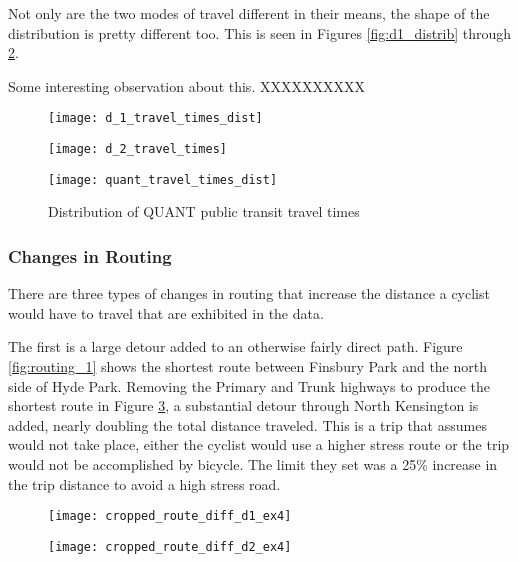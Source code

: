 Not only are the two modes of travel different in their means, the shape of the distribution is pretty different too. This is seen in Figures \ref{fig:d1_distrib} through \ref{fig:quant_distrib}. 

Some interesting observation about this. XXXXXXXXXX


\begin{figure}
\centering
\begin{minipage}{.5\textwidth}
  \centering
  \texttt{[image: d\_1\_travel\_times\_dist]}
  \label{fig:d1_distrib}
\end{minipage}%
\begin{minipage}{.5\textwidth}
  \centering
  \texttt{[image: d\_2\_travel\_times]}
  \label{fig:d2_distrib}
\end{minipage}
\end{figure}

\begin{figure}
\centering
\texttt{[image: quant\_travel\_times\_dist]}
\caption{Distribution of QUANT public transit travel times}
\label{fig:quant_distrib}
\end{figure}


\subsubsection{Changes in Routing} 

There are three types of changes in routing that increase the distance a cyclist would have to travel that are exhibited in the data. 

The first is a large detour added to an otherwise fairly direct path. Figure \ref{fig:routing_1} shows the shortest route between Finsbury Park and the north side of Hyde Park. Removing the Primary and Trunk highways to produce the shortest route in Figure \ref{fig:routing_2}, a substantial detour through North Kensington is added, nearly doubling the total distance traveled. This is a trip that \cite{furth2016network} assumes would not take place, either the cyclist would use a higher stress route or the trip would not be accomplished by bicycle. The limit they set was a 25\% increase in the trip distance to avoid a high stress road. 

\begin{figure}
\centering
\begin{minipage}{.5\textwidth}
  \centering
  \texttt{[image: cropped\_route\_diff\_d1\_ex4]}
  \label{fig:routing_1}
\end{minipage}%
\begin{minipage}{.5\textwidth}
  \centering
  \texttt{[image: cropped\_route\_diff\_d2\_ex4]}
  \label{fig:routing_2}
\end{minipage}
\end{figure}

